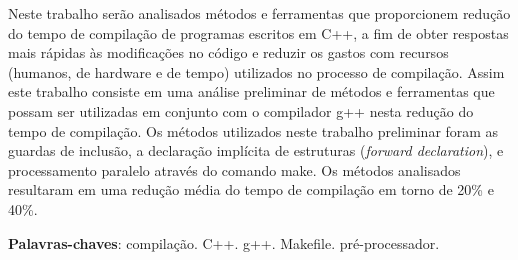 \begin{resumo}
Neste trabalho serão analisados métodos e ferramentas
 que proporcionem redução do tempo de compilação
 de programas escritos em C++, a fim de obter respostas mais
 rápidas às modificações no código e reduzir os gastos com recursos
 (humanos, de hardware e de tempo) utilizados no processo
 de compilação. Assim este trabalho consiste em uma
 análise preliminar de métodos e ferramentas que possam
 ser utilizadas em conjunto com o compilador g++ 
 nesta redução do tempo de compilação. Os métodos utilizados
 neste trabalho preliminar foram as guardas de inclusão,
 a declaração implícita de estruturas (\textit{forward declaration}),
 e processamento paralelo através do comando make.
 Os métodos analisados resultaram em uma redução média 
 do tempo de compilação em torno de 20\% e 40\%.

 \vspace{\onelineskip}
    
 \noindent
 \textbf{Palavras-chaves}: compilação. C++. g++. Makefile. pré-processador. 

\end{resumo}
